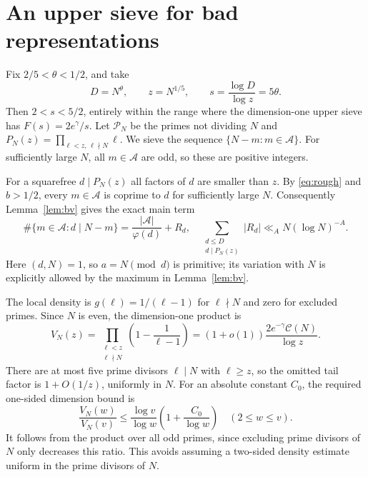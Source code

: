\documentclass[11pt]{article}
\newcommand{\CN}{\mathcal C(N)}
\begin{document}
\section{An upper sieve for bad representations}
Fix $2/5<\theta<1/2$, and take
\[
 D=N^\theta,\qquad z=N^{1/5},\qquad s=\frac{\log D}{\log z}=5\theta.
\]
Then $2<s<5/2$, entirely within the range where the dimension-one
upper sieve has $F(s)=2e^\gamma/s$.
Let $\mathscr P_N$ be the primes not dividing $N$ and
$P_N(z)=\prod_{\ell<z,\,\ell\nmid N}\ell$.
We sieve the sequence $\{N-m:m\in\mathcal A\}$. For sufficiently large
$N$, all $m\in\mathcal A$ are odd, so these are positive integers.

For a squarefree $d\mid P_N(z)$ all factors of $d$ are smaller than $z$.
By \eqref{eq:rough} and $b>1/2$, every $m\in\mathcal A$ is coprime to
$d$ for sufficiently large $N$. Consequently Lemma~\ref{lem:bv} gives
the exact main term
\[
 \#\{m\in\mathcal A:d\mid N-m\}
       =\frac{|\mathcal A|}{\varphi(d)}+R_d,
 \quad
 \sum_{\substack{d\le D\\d\mid P_N(z)}}|R_d|
       \ll_A N(\log N)^{-A}.
\]
Here $(d,N)=1$, so $a=N\pmod d$ is primitive; its variation with $N$
is explicitly allowed by the maximum in Lemma~\ref{lem:bv}.

The local density is $g(\ell)=1/(\ell-1)$ for $\ell\nmid N$ and zero
for excluded primes. Since $N$ is even, the dimension-one product is
\begin{equation}\label{eq:v}
 V_N(z)=\prod_{\substack{\ell<z\\\ell\nmid N}}
             \left(1-\frac1{\ell-1}\right)
       =\left(1+o(1)\right)\frac{2e^{-\gamma}\CN}{\log z}.
\end{equation}
There are at most five prime divisors $\ell\mid N$ with $\ell\ge z$,
so the omitted tail factor is $1+O(1/z)$, uniformly in $N$.
For an absolute constant $C_0$, the required one-sided dimension bound is
\[
 \frac{V_N(w)}{V_N(v)}\le\frac{\log v}{\log w}
             \left(1+\frac{C_0}{\log w}\right)\quad(2\le w\le v).
\]
It follows from the product over all odd primes, since excluding prime
divisors of $N$ only decreases this ratio. This avoids assuming a
two-sided density estimate uniform in the prime divisors of $N$.
\end{document}
